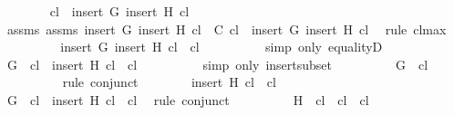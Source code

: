 \begin{isabellebody}
\ \ \ \ \ \ \isamarkupfalse%
\ {\isachardoublequoteopen}{\isacharquery}cl\ {\isacharequal}\ insert\ G\ {\isacharparenleft}insert\ H\ {\isacharquery}cl{\isacharparenright}{\isachardoublequoteclose}\ \isanewline
\ \ \ \ \ \ \ \ \isamarkupfalse%
\ assms{\isacharparenleft}{}{\isacharparenright}\ assms{\isacharparenleft}{}{\isacharparenright}\ {\isacartoucheopen}insert\ G\ {\isacharparenleft}insert\ H\ {\isacharquery}cl{\isacharparenright}\ {\isasymin}\ C{\isacartoucheclose}\ {\isacartoucheopen}{\isacharquery}cl\ {\isasymsubseteq}\ insert\ G\ {\isacharparenleft}insert\ H\ {\isacharquery}cl{\isacharparenright}{\isacartoucheclose}\ \isamarkupfalse%
\ {\isacharparenleft}rule\ cl{\isacharunderscore}max{\isacharparenright}\isanewline
\ \ \ \ \ \ \isamarkupfalse%
\ \isamarkupfalse%
\ {\isachardoublequoteopen}insert\ G\ {\isacharparenleft}insert\ H\ {\isacharquery}cl{\isacharparenright}\ {\isasymsubseteq}\ {\isacharquery}cl{\isachardoublequoteclose}\isanewline
\ \ \ \ \ \ \ \ \isamarkupfalse%
\ {\isacharparenleft}simp\ only{\isacharcolon}\ equalityD{}{\isacharparenright}\isanewline
\ \ \ \ \ \ \isamarkupfalse%
\ \isamarkupfalse%
\ {\isachardoublequoteopen}G\ {\isasymin}\ {\isacharquery}cl\ {\isasymand}\ insert\ H\ {\isacharquery}cl\ {\isasymsubseteq}\ {\isacharquery}cl{\isachardoublequoteclose}\isanewline
\ \ \ \ \ \ \ \ \isamarkupfalse%
\ {\isacharparenleft}simp\ only{\isacharcolon}\ insert{\isacharunderscore}subset{\isacharparenright}\isanewline
\ \ \ \ \ \ \isamarkupfalse%
\ \isamarkupfalse%
\ {\isachardoublequoteopen}G\ {\isasymin}\ {\isacharquery}cl{\isachardoublequoteclose}\isanewline
\ \ \ \ \ \ \ \ \isamarkupfalse%
\ {\isacharparenleft}rule\ conjunct{}{\isacharparenright}\isanewline
\ \ \ \ \ \ \isamarkupfalse%
\ {\isachardoublequoteopen}insert\ H\ {\isacharquery}cl\ {\isasymsubseteq}\ {\isacharquery}cl{\isachardoublequoteclose}\isanewline
\ \ \ \ \ \ \ \ \isamarkupfalse%
\ {\isacartoucheopen}G\ {\isasymin}\ {\isacharquery}cl\ {\isasymand}\ insert\ H\ {\isacharquery}cl\ {\isasymsubseteq}\ {\isacharquery}cl{\isacartoucheclose}\ \isamarkupfalse%
\ {\isacharparenleft}rule\ conjunct{}{\isacharparenright}\isanewline
\ \ \ \ \ \ \isamarkupfalse%
\ \isamarkupfalse%
\ {\isachardoublequoteopen}H\ {\isasymin}\ {\isacharquery}cl\ {\isasymand}\ {\isacharquery}cl\ {\isasymsubseteq}\ {\isacharquery}cl{\isachardoublequoteclose}\isanewline

\end{isabellebody}
